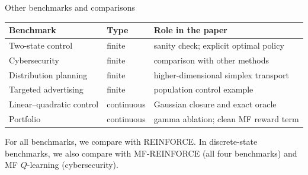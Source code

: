 \documentclass[9pt]{beamer}
\begin{document}
\begin{frame}{Other benchmarks and comparisons}
\begin{table}
\centering
\small
\begin{tabular}{lll}
\toprule
Benchmark & Type & Role in the paper \\
\midrule
Two-state control \cite{meunier2026model,gu2023dynamic} & finite & sanity check; explicit optimal policy \\
Cybersecurity \cite{meunier2026model,kolokoltsov2016mean,carmona2023model} & finite & comparison with other methods \\
Distribution planning \cite{meunier2026model,carmona2023model} & finite & higher-dimensional simplex transport \\
Targeted advertising \cite{motte2021mathematical} & finite & population control example \\
Linear--quadratic control & continuous & Gaussian closure and exact oracle \\
Portfolio \cite{cui_li_li_mean_variance,fischer_livieri_mean_variance} & continuous & gamma ablation; clean MF reward term \\
\bottomrule
\end{tabular}
\end{table}

For all benchmarks, we compare with REINFORCE. In discrete-state benchmarks, we also compare with MF-REINFORCE \cite{meunier2026model} (all four benchmarks) and MF $Q$-learning \cite{carmona2023model} (cybersecurity).

\end{frame}
\end{document}
